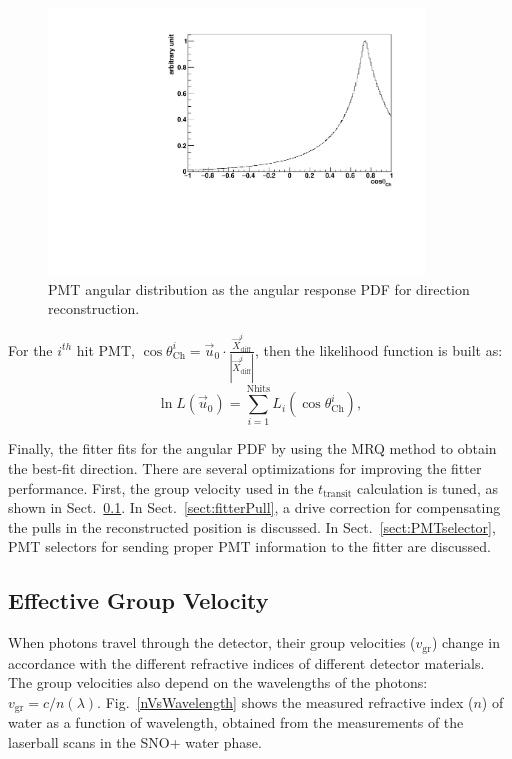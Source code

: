 \begin{figure}[!htb]
	\centering
	\includegraphics[width=10cm]{MPW_angularPDF.pdf}
	\caption{PMT angular distribution as the angular response PDF for direction reconstruction.}
	\label{fig:MPW_angularPDF}
\end{figure}

For the $i^{th}$ hit PMT, $\cos\theta^i_{\mathrm{Ch}}=\vec{u}_0\cdot\frac{\vec{X}^i_{{\mathrm{diff}}}}{|\vec{X}^i_{{\mathrm{diff}}}|}$, then the likelihood function is built as:
\begin{equation}
\ln L(\vec{u}_0)=\sum_{i=1}^{{\mathrm{Nhits}}}L_i(\cos\theta_{\mathrm{Ch}}^i),
\end{equation}

Finally, the fitter fits for the angular PDF by using the MRQ method to obtain the best-fit direction. There are several optimizations for improving the fitter performance. First, the group velocity used in the $t_{\mathrm{transit}}$ calculation is tuned, as shown in Sect.~\ref{sect:tuneGroupVelocity}. In Sect.~\ref{sect:fitterPull}, a drive correction for compensating the pulls in the reconstructed position is discussed. In Sect.~\ref{sect:PMTselector}, PMT selectors for sending proper PMT information to the fitter are discussed. 

\subsection{Effective Group Velocity}\label{sect:tuneGroupVelocity}

When photons travel through the detector, their group velocities ($v_\mathrm{gr}$) change in accordance with the different refractive indices of different detector materials. The group velocities also depend on the wavelengths of the photons: $v_\mathrm{gr}=c/n(\lambda)$. Fig.~\ref{nVsWavelength} shows the measured refractive index ($n$) of water as a function of wavelength, obtained from the measurements of the laserball scans in the SNO+ water phase\cite{laserball_groupVelocity}. %

